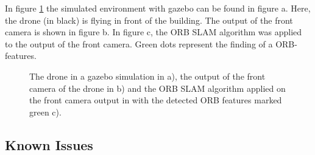 	In figure \ref{fig:simfigs} the simulated environment with gazebo can be found in figure a. Here, the drone (in black) is flying in front of the building. 
	The output of the front camera is shown in figure b. In figure c, the ORB SLAM algorithm was applied to the output of the front camera. Green dots represent the 
	finding of a ORB-features.
	
	\begin{figure}%
    \centering
    \qquad
	\qquad
    \caption{
	The drone in a gazebo simulation in a), the output of the front camera of the drone in b) and
	the ORB SLAM algorithm applied on the front camera output in with the detected ORB features marked green c).
	}%
    \label{fig:simfigs}%
	\end{figure}

	\subsection{Known Issues} \label{frameissues}
	
